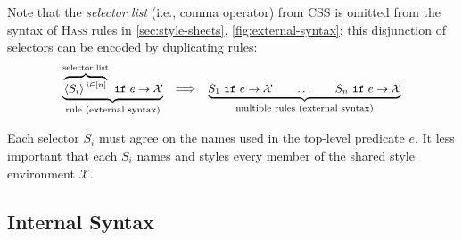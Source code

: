 \documentclass[acmsmall, screen]{acmart}
\newcommand{\hass}
{\textsc{Hass}}
\newcommand{\varExp}{e}
\newcommand{\varPathSelector}{S}
\newcommand{\varNamedStyles}
{\mathcal{X}}
\newcommand{\smallSep}
  {\hspace{0.02in}}
\newcommand{\rangeN}[3]
{\langle#3\rangle\smallSep^{#1 \in [#2]}}
\newcommand{\guardedRule}[2]{#1\ \texttt{if}\ #2}
\newcommand{\guardedRuleArrow}[3]{\guardedRule{#1}{#2}\rightarrow{#3}}
\begin{document}
Note that the \emph{selector list} (i.e., comma operator) from CSS is omitted from the syntax of \hass{} rules in \autoref{sec:style-sheets}, \autoref{fig:external-syntax}; this disjunction of selectors can be encoded by duplicating rules:
$$
\small
\underbrace{
\guardedRuleArrow
  {\overbrace{\rangeN{i}{n}{\varPathSelector_i}}^{\textrm{selector list}}}
  {\varExp}
  {\varNamedStyles}
}_{\textrm{rule (external syntax)}}
\hspace{0.10in}
\Longrightarrow
\hspace{0.10in}
\underbrace{
\guardedRuleArrow{\varPathSelector_1}{\varExp}{\varNamedStyles}
\hspace{0.25in} \ldots
\hspace{0.25in}
\guardedRuleArrow{\varPathSelector_n}{\varExp}{\varNamedStyles}
}_{\textrm{multiple rules (external syntax)}}
$$

\noindent
Each selector $\varPathSelector_i$ must agree on the names used in the top-level predicate $\varExp$.
It less important that each $\varPathSelector_i$ names and styles every member of the shared style environment $\varNamedStyles$.


\subsection{Internal Syntax}
\label{sec:style-sheets-internal}

\newcommand{\blah}[1]
{\raisebox{-4pt}{#1}} 

\newcommand{\desugarRule}[3]
  {\blah{\ensuremath{#1}} & \blah{$\Longrightarrow$} &
   \blah{\ensuremath{#2}} & \blah{\ensuremath{#3}} \\[6pt]}

\newcommand{\justInternal}[1]
  { & & \blah{\ensuremath{#1}} & \\[6pt]}

\newcommand{\desugarCategory}[4]
{\cellcolor[HTML]{dddddd} \blah{\textbf{#1}} \blah{\ensuremath{#2}} &
   \cellcolor[HTML]{dddddd} &
   \cellcolor[HTML]{dddddd} \blah{\textbf{#3}} \blah{\ensuremath{#4}} &
   \cellcolor[HTML]{dddddd} \\[6pt]\hline}

\newcommand{\nextCategory}
  {\hline\hline}

\newcommand{\arrowNamedStylesHighlight}
  {\fcolorbox{red}{yellow}{$\rightarrow\varNamedStyles\vphantom{(}$}}

\newcommand{\namedPatternHighlight}[2]
  {\fcolorbox{red}{yellow}{$#1\smallSep@\vphantom{(}$}\smallSep#2}
\end{document}
